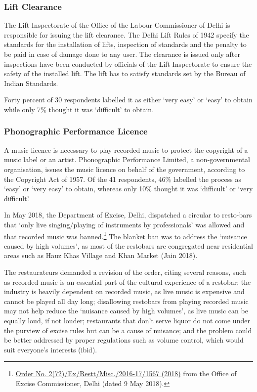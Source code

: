 \documentclass[a4paper, 12pt]{article}
\begin{document}
	
	
		\subsubsection{Lift Clearance}
		The Lift Inspectorate of the Office of the Labour Commissioner of Delhi is responsible for issuing the lift clearance. The Delhi Lift Rules of 1942 specify the standards for the installation of lifts, inspection of standards and the penalty to be paid in case of damage done to any user. The clearance is issued only after inspections have been conducted by officials of the Lift Inspectorate to ensure the safety of the installed lift. The lift has to satisfy standards set by the Bureau of Indian Standards.
		
		Forty percent of 30 respondents labelled it as either ‘very easy’ or ‘easy’ to obtain while only 7\% thought it was ‘difficult’ to obtain. %
		
		
		\subsubsection{Phonographic Performance Licence}
		A music licence is necessary to play recorded music to protect the copyright of a music label or an artist. Phonographic Performance Limited, a non-governmental organisation, issues the music licence on behalf of the government, according to the Copyright Act of 1957. Of the 41 respondents, 46\% labelled the process as ‘easy’ or ‘very easy’ to obtain, whereas only 10\% thought it was ‘difficult’ or ‘very difficult’.
		
		In May 2018, the Department of Excise, Delhi, dispatched a circular to resto-bars that ‘only live singing/playing of instruments by professionals’ was allowed and that recorded music was banned.\footnote{\href{https://bit.ly/2MzCM02} {Order No. 2(72)/Ex/Restt/Misc./2016-17/1567 (2018)} from the Office of Excise Commissioner, Delhi (dated 9 May 2018).} The blanket ban was to address the ‘nuisance caused by high volumes’, as most of the restobars are congregated near residential areas such as Hauz Khas Village and Khan Market (Jain 2018).
		
		The restaurateurs demanded a revision of the order, citing several reasons, such as recorded music is an essential part of the cultural experience of a restobar; the industry is heavily dependent on recorded music, as live music is expensive and cannot be played all day long; disallowing restobars from playing recorded music may not help reduce the ‘nuisance caused by high volumes’, as live music can be equally loud, if not louder; restaurants that don’t serve liquor do not come under the purview of excise rules but can be a cause of nuisance; and the problem could be better addressed by proper regulations such as volume control, which would suit everyone’s interests (ibid).
		
\end{document}
